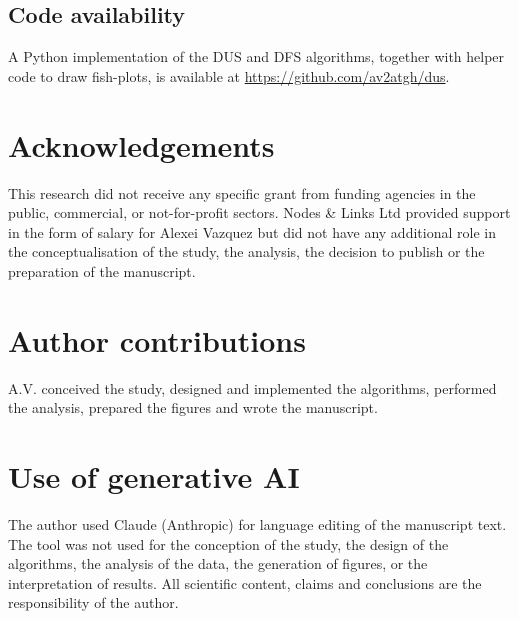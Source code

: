 \documentclass[11pt,a4paper]{article}
\begin{document}
\subsection*{Code availability}

A Python implementation of the DUS and DFS algorithms, together with helper code to draw fish-plots, is available at \url{https://github.com/av2atgh/dus}.

\section*{Acknowledgements}

This research did not receive any specific grant from funding agencies in the public, commercial, or not-for-profit sectors. Nodes \& Links Ltd provided support in the form of salary for Alexei Vazquez but did not have any additional role in the conceptualisation of the study, the analysis, the decision to publish or the preparation of the manuscript.

\section*{Author contributions}

A.V. conceived the study, designed and implemented the algorithms, performed the analysis, prepared the figures and wrote the manuscript.

\section*{Use of generative AI}

The author used Claude (Anthropic) for language editing of the manuscript text. The tool was not used for the conception of the study, the design of the algorithms, the analysis of the data, the generation of figures, or the interpretation of results. All scientific content, claims and conclusions are the responsibility of the author.

%
%
\end{document}
